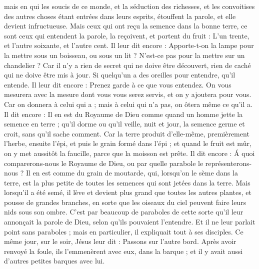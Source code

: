 \begin{multicols}{2}
mais en qui les soucis de ce monde, et la séduction des richesses, et les convoitises des autres choses étant entrées dans leurs esprits, étouffent la parole, et elle devient infructueuse.
Mais ceux qui ont reçu la semence dans la bonne terre, ce sont ceux qui entendent la parole, la reçoivent, et portent du fruit : L'un trente, et l'autre soixante, et l'autre cent{}.
Il leur dit encore : Apporte-t-on la lampe pour la mettre sous un boisseau, ou sous un lit ? N'est-ce pas pour la mettre sur un chandelier ?
Car il n'y a rien de secret qui ne doive être découvert, rien de caché qui ne doive être mis à jour.
Si quelqu'un a des oreilles pour entendre, qu'il entende.
Il leur dit encore : Prenez garde à ce que vous entendez. On vous mesurera avec la mesure dont vous vous serez servis, et on y ajoutera pour vous.
Car on donnera à celui qui a ; mais à celui qui n’a pas, on ôtera même ce qu’il a.
Il dit encore : Il en est du Royaume de Dieu comme quand un homme jette la semence en terre ;
qu’il dorme ou qu’il veille, nuit et jour, la semence germe et croit, sans qu'il sache comment.
Car la terre produit d'elle-même, premièrement l'herbe, ensuite l'épi, et puis le grain formé dans l'épi ;
et quand le fruit est mûr, on y met aussitôt la faucille, parce que la moisson est prête.
Il dit encore : Á quoi comparerons-nous le Royaume de Dieu, ou par quelle parabole le représenterons-nous ?
Il en est comme du grain de moutarde, qui, lorsqu'on le sème dans la terre, est la plus petite de toutes les semences qui sont jetées dans la terre.
Mais lorsqu'il a été semé, il lève et devient plus grand que toutes les autres plantes, et pousse de grandes branches, en sorte que les oiseaux du ciel peuvent faire leurs nids sous son ombre.
C’est par beaucoup de paraboles de cette sorte qu’il leur annonçait la parole de Dieu, selon qu'ils pouvaient l'entendre.
Et il ne leur parlait point sans paraboles ; mais en particulier, il expliquait tout à ses disciples.
Ce même jour, sur le soir, Jésus leur dit : Passons sur l’autre bord.
Après avoir renvoyé la foule, ils l'emmenèrent avec eux, dans la barque ; et il y avait aussi d'autres petites barques avec lui.

\end{multicols}
